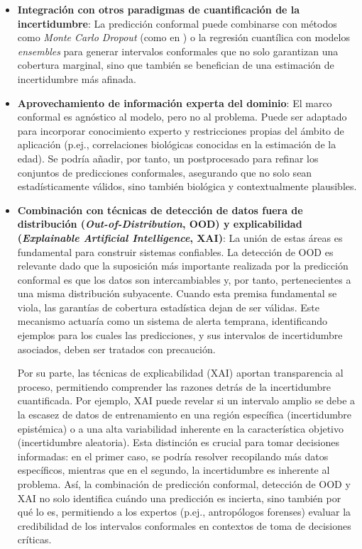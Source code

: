 \begin{itemize}

    \item \textbf{Integración con otros paradigmas de cuantificación de la incertidumbre}: La predicción conformal puede combinarse con métodos como \textit{Monte Carlo Dropout} (como en \cite{bethell2024}) o la regresión cuantílica con modelos \textit{ensembles} para generar intervalos conformales que no solo garantizan una cobertura marginal, sino que también se benefician de una estimación de incertidumbre más afinada. 

    \item \textbf{Aprovechamiento de información experta del dominio}: El marco conformal es agnóstico al modelo, pero no al problema. Puede ser adaptado para incorporar conocimiento experto y restricciones propias del ámbito de aplicación (p.ej., correlaciones biológicas conocidas en la estimación de la edad). 
    Se podría añadir, por tanto, un postprocesado para refinar los conjuntos de predicciones conformales,
    asegurando que no solo sean estadísticamente válidos, sino también biológica y contextualmente plausibles.
    
    \item \textbf{Combinación con técnicas de detección de datos fuera de distribución (\textit{Out-of-Distribution}, OOD) y explicabilidad (\textit{Explainable Artificial Intelligence}, XAI)}: La unión de estas áreas es fundamental para construir sistemas confiables. 
    La detección de OOD es relevante dado que la suposición más importante realizada por la predicción conformal es que los datos son intercambiables y, por tanto, pertenecientes a una misma distribución subyacente. Cuando esta premisa fundamental se viola, las garantías de cobertura estadística dejan de ser válidas. Este mecanismo actuaría como un sistema de alerta temprana, identificando ejemplos para los cuales las predicciones, y sus intervalos de incertidumbre asociados, deben ser tratados con precaución.
    
    Por su parte, las técnicas de explicabilidad (XAI) aportan transparencia al proceso, permitiendo comprender las razones detrás de la incertidumbre cuantificada. Por ejemplo, XAI puede revelar si un intervalo amplio se debe a la escasez de datos de entrenamiento en una región específica (incertidumbre epistémica) o a una alta variabilidad inherente en la característica objetivo (incertidumbre aleatoria). Esta distinción es crucial para tomar decisiones informadas: en el primer caso, se podría resolver recopilando más datos específicos, mientras que en el segundo, la incertidumbre es inherente al problema. Así, la combinación de predicción conformal, detección de OOD y XAI no solo identifica cuándo una predicción es incierta, sino también por qué lo es, permitiendo a los expertos (p.ej., antropólogos forenses) evaluar la credibilidad de los intervalos conformales en contextos de toma de decisiones críticas.

\end{itemize}

